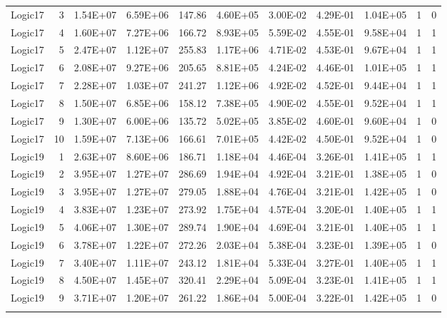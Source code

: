 \begin{longtable}{@{}l!{\vrule}r!{\vrule}c!{\vrule}c!{\vrule}c!{\vrule}c!{\vrule}c!{\vrule}c!{\vrule}c!{\vrule}c!{\vrule}c@{}}
Logic17 & 3 & 1.54E+07 & 6.59E+06 & 147.86 & 4.60E+05 & 3.00E-02 & 4.29E-01 & 1.04E+05 & 1 & 0 \\
Logic17 & 4 & 1.60E+07 & 7.27E+06 & 166.72 & 8.93E+05 & 5.59E-02 & 4.55E-01 & 9.58E+04 & 1 & 1 \\
Logic17 & 5 & 2.47E+07 & 1.12E+07 & 255.83 & 1.17E+06 & 4.71E-02 & 4.53E-01 & 9.67E+04 & 1 & 1 \\
Logic17 & 6 & 2.08E+07 & 9.27E+06 & 205.65 & 8.81E+05 & 4.24E-02 & 4.46E-01 & 1.01E+05 & 1 & 1 \\
Logic17 & 7 & 2.28E+07 & 1.03E+07 & 241.27 & 1.12E+06 & 4.92E-02 & 4.52E-01 & 9.44E+04 & 1 & 1 \\
Logic17 & 8 & 1.50E+07 & 6.85E+06 & 158.12 & 7.38E+05 & 4.90E-02 & 4.55E-01 & 9.52E+04 & 1 & 1 \\
Logic17 & 9 & 1.30E+07 & 6.00E+06 & 135.72 & 5.02E+05 & 3.85E-02 & 4.60E-01 & 9.60E+04 & 1 & 0 \\
Logic17 & 10 & 1.59E+07 & 7.13E+06 & 166.61 & 7.01E+05 & 4.42E-02 & 4.50E-01 & 9.52E+04 & 1 & 0 \\
\hline
Logic19 & 1 & 2.63E+07 & 8.60E+06 & 186.71 & 1.18E+04 & 4.46E-04 & 3.26E-01 & 1.41E+05 & 1 & 1 \\
Logic19 & 2 & 3.95E+07 & 1.27E+07 & 286.69 & 1.94E+04 & 4.92E-04 & 3.21E-01 & 1.38E+05 & 1 & 0 \\
Logic19 & 3 & 3.95E+07 & 1.27E+07 & 279.05 & 1.88E+04 & 4.76E-04 & 3.21E-01 & 1.42E+05 & 1 & 0 \\
Logic19 & 4 & 3.83E+07 & 1.23E+07 & 273.92 & 1.75E+04 & 4.57E-04 & 3.20E-01 & 1.40E+05 & 1 & 1 \\
Logic19 & 5 & 4.06E+07 & 1.30E+07 & 289.74 & 1.90E+04 & 4.69E-04 & 3.21E-01 & 1.40E+05 & 1 & 1 \\
Logic19 & 6 & 3.78E+07 & 1.22E+07 & 272.26 & 2.03E+04 & 5.38E-04 & 3.23E-01 & 1.39E+05 & 1 & 0 \\
Logic19 & 7 & 3.40E+07 & 1.11E+07 & 243.12 & 1.81E+04 & 5.33E-04 & 3.27E-01 & 1.40E+05 & 1 & 1 \\
Logic19 & 8 & 4.50E+07 & 1.45E+07 & 320.41 & 2.29E+04 & 5.09E-04 & 3.23E-01 & 1.41E+05 & 1 & 1 \\
Logic19 & 9 & 3.71E+07 & 1.20E+07 & 261.22 & 1.86E+04 & 5.00E-04 & 3.22E-01 & 1.42E+05 & 1 & 0 \\
\hline
{}

\end{longtable}
